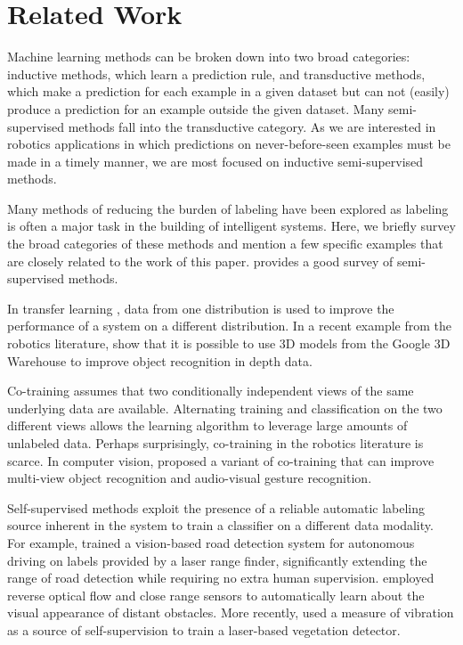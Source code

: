 \documentclass[conference]{IEEEtran}
\begin{document}
\section{Related Work}

Machine learning methods can be broken down into two broad categories: inductive methods, which learn a prediction rule, and transductive methods, which make a prediction for each example in a given dataset but can not (easily) produce a prediction for an example outside the given dataset.  Many semi-supervised methods fall into the transductive category.  As we are interested in robotics applications in which predictions on never-before-seen examples must be made in a timely manner, we are most focused on inductive semi-supervised methods.

Many methods of reducing the burden of labeling have been explored as labeling is often a major task in the building of intelligent systems.  Here, we briefly survey the broad categories of these methods and mention a few specific examples that are closely related to the work of this paper.  \citet{Zhu2007} provides a good survey of semi-supervised methods.

In transfer learning \citep{Pan2010}, data from one distribution is used to improve the performance of a system on a different distribution.  In a recent example from the robotics literature, \citet{Lai2010,Lai2009} show that it is possible to use 3D models from the Google 3D Warehouse to improve object recognition in depth data.

Co-training \citep{Mitchell1998} assumes that two conditionally independent views of the same underlying data are available.  Alternating training and classification on the two different views allows the learning algorithm to leverage large amounts of unlabeled data.  Perhaps surprisingly, co-training in the robotics literature is scarce.  In computer vision, \citet{Christoudias2009} proposed a variant of co-training that can improve multi-view object recognition and audio-visual gesture recognition.

Self-supervised methods exploit the presence of a reliable automatic labeling source inherent in the system to train a classifier on a different data modality.  For example, \citet{Dahlkamp2006} trained a vision-based road detection system for autonomous driving on labels provided by a laser range finder, significantly extending the range of road detection while requiring no extra human supervision. \citet{Lookingbill2007} employed reverse optical flow and close range sensors to automatically learn about the visual appearance of distant obstacles.  More recently, \citet{Wurm2009} used a measure of vibration as a source of self-supervision to train a laser-based vegetation detector.
\end{document}
